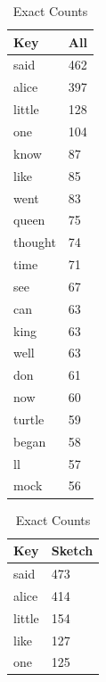 \documentclass[shortpaper]{revdetua}
\begin{document}
\begin{table}[!htb]
    \begin{subtable}{.5\linewidth}
        \centering
        \begin{tabular}{|l|l|}
            \hline
            Key     & All \\ \hline
            said    & 462 \\ \hline
            alice   & 397 \\ \hline
            little  & 128 \\ \hline
            one     & 104 \\ \hline
            know    & 87  \\ \hline
            like    & 85  \\ \hline
            went    & 83  \\ \hline
            queen   & 75  \\ \hline
            thought & 74  \\ \hline
            time    & 71  \\ \hline
            see     & 67  \\ \hline
            can     & 63  \\ \hline
            king    & 63  \\ \hline
            well    & 63  \\ \hline
            don     & 61  \\ \hline
            now     & 60  \\ \hline
            turtle  & 59  \\ \hline
            began   & 58  \\ \hline
            ll      & 57  \\ \hline
            mock    & 56  \\ \hline
        \end{tabular}
        \caption{Exact Counts}
    \end{subtable}%
    \begin{subtable}{.5\linewidth}
        \centering 
        \begin{tabular}{|l|l|}
            \hline
            Key     & Sketch \\ \hline
            said    & 473    \\ \hline
            alice   & 414    \\ \hline
            little  & 154    \\ \hline
            like    & 127    \\ \hline
            one     & 125    \\ \hline

\end{tabular}
\end{subtable}
\end{table}
\end{document}
